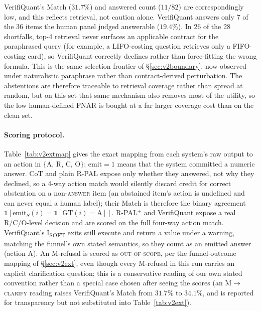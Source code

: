 \documentclass[sigconf,anonymous]{acmart}
\begin{document}
VerifiQuant's Match ($31.7\%$) and answered count ($11/82$) are correspondingly low, and this reflects retrieval, not caution alone. VerifiQuant answers only 7 of the 36 items the human panel judged answerable ($19.4\%$). In 26 of the 28 shortfalls, top-4 retrieval never surfaces an applicable contract for the paraphrased query (for example, a LIFO-costing question retrieves only a FIFO-costing card), so VerifiQuant correctly declines rather than force-fitting the wrong formula. This is the same selection frontier of \S\ref{sec:v2boundary}, now observed under naturalistic paraphrase rather than contract-derived perturbation. The abstentions are therefore traceable to retrieval coverage rather than spread at random, but on this set that same mechanism also removes most of the utility, so the low human-defined FNAR is bought at a far larger coverage cost than on the clean set.

\paragraph{Scoring protocol.}
Table~\ref{tab:v2extmap} gives the exact mapping from each system's raw output to an action in $\{$A, R, C, O$\}$; $\mathrm{emit}{=}1$ means that the system committed a numeric answer. CoT and plain R-PAL expose only whether they answered, not why they declined, so a 4-way action match would silently discard credit for correct abstention on a non-\textsc{answer} item (an abstained item's action is undefined and can never equal a human label); their Match is therefore the binary agreement $\mathbb{1}[\mathrm{emit}_S(i) = \mathbb{1}[\mathrm{GT}(i){=}\text{A}]]$. R-PAL$^{+}$ and VerifiQuant expose a real R/C/O-level decision and are scored on the full four-way action match. VerifiQuant's I\textsubscript{SOFT} exits still execute and return a value under a warning, matching the funnel's own stated semantics, so they count as an emitted answer (action A). An M-refusal is scored as \textsc{out-of-scope}, per the funnel-outcome mapping of \S\ref{sec:v2ext}, even though every M-refusal in this run carries an explicit clarification question; this is a conservative reading of our own stated convention rather than a special case chosen after seeing the scores (an \textsc{M}$\to$\textsc{clarify} reading raises VerifiQuant's Match from $31.7\%$ to $34.1\%$, and is reported for transparency but not substituted into Table~\ref{tab:v2ext}).
\end{document}
